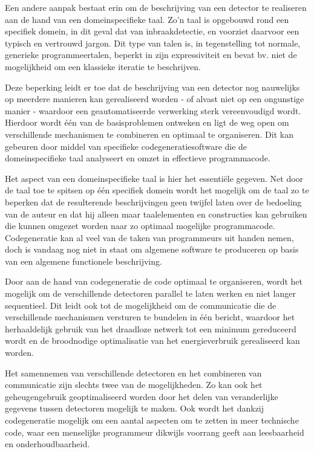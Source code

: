 \documentclass[DIV=calc,paper=a4,fontsize=11pt,twocolumn]{scrartcl}
\begin{document}
Een andere aanpak bestaat erin om de beschrijving van een detector te
realiseren aan de hand van een domeinspecifieke taal. Zo'n taal is opgebouwd
rond een specifiek domein, in dit geval dat van inbraakdetectie, en voorziet
daarvoor een typisch en vertrouwd jargon. Dit type van talen is, in
tegenstelling tot normale, generieke programmeertalen, beperkt in zijn
expressiviteit en bevat bv. niet de mogelijkheid om een klassieke iteratie te
beschrijven.

Deze beperking leidt er toe dat de beschrijving van een detector nog nauwelijks
op meerdere manieren kan gerealiseerd worden - of alvast niet op een ongunstige
manier - waardoor een geautomatiseerde verwerking sterk vereenvoudigd wordt.
Hierdoor wordt \'e\'en van de basisproblemen ontweken en ligt de weg open om
verschillende mechanismen te combineren en optimaal te organiseren. Dit kan
gebeuren door middel van specifieke codegeneratiesoftware die de
domeinspecifieke taal analyseert en omzet in effectieve programmacode.

Het aspect van een domeinspecifieke taal is hier het essenti\"ele gegeven. Net
door de taal toe te spitsen op \'e\'en specifiek domein wordt het mogelijk om
de taal zo te beperken dat de resulterende beschrijvingen geen twijfel laten
over de bedoeling van de auteur en dat hij alleen maar taalelementen en
constructies kan gebruiken die kunnen omgezet worden naar zo optimaal mogelijke
programmacode. Codegeneratie kan al veel van de taken van programmeurs uit
handen nemen, doch is vandaag nog niet in staat om algemene software te
produceren op basis van een algemene functionele beschrijving.

Door aan de hand van codegeneratie de code optimaal te organiseren, wordt het
mogelijk om de verschillende detectoren parallel te laten werken en niet langer
sequentieel. Dit leidt ook tot de mogelijkheid om de communicatie die de
verschillende mechanismen versturen te bundelen in \'e\'en bericht, waardoor
het herhaaldelijk gebruik van het draadloze netwerk tot een minimum gereduceerd
wordt en de broodnodige optimalisatie van het energieverbruik gerealiseerd kan
worden.

Het samennemen van verschillende detectoren en het combineren van communicatie
zijn slechts twee van de mogelijkheden. Zo kan ook het geheugengebruik
geoptimaliseerd worden door het delen van veranderlijke gegevens tussen
detectoren mogelijk te maken. Ook wordt het dankzij codegeneratie mogelijk om
een aantal aspecten om te zetten in meer technische code, waar een menselijke
programmeur dikwijls voorrang geeft aan leesbaarheid en onderhoudbaarheid.
\end{document}
